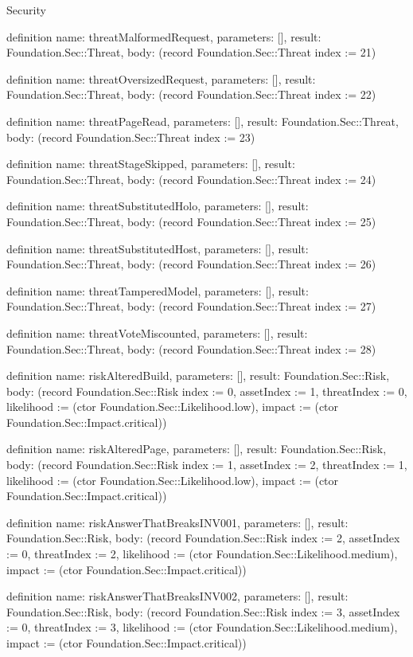 \begin{lexlean}{Security}
\begin{semanticmodule}
definition{
  name: threatMalformedRequest,
  parameters: [],
  result: Foundation.Sec::Threat,
  body: (record Foundation.Sec::Threat {index := 21})
}

definition{
  name: threatOversizedRequest,
  parameters: [],
  result: Foundation.Sec::Threat,
  body: (record Foundation.Sec::Threat {index := 22})
}

definition{
  name: threatPageRead,
  parameters: [],
  result: Foundation.Sec::Threat,
  body: (record Foundation.Sec::Threat {index := 23})
}

definition{
  name: threatStageSkipped,
  parameters: [],
  result: Foundation.Sec::Threat,
  body: (record Foundation.Sec::Threat {index := 24})
}

definition{
  name: threatSubstitutedHolo,
  parameters: [],
  result: Foundation.Sec::Threat,
  body: (record Foundation.Sec::Threat {index := 25})
}

definition{
  name: threatSubstitutedHost,
  parameters: [],
  result: Foundation.Sec::Threat,
  body: (record Foundation.Sec::Threat {index := 26})
}

definition{
  name: threatTamperedModel,
  parameters: [],
  result: Foundation.Sec::Threat,
  body: (record Foundation.Sec::Threat {index := 27})
}

definition{
  name: threatVoteMiscounted,
  parameters: [],
  result: Foundation.Sec::Threat,
  body: (record Foundation.Sec::Threat {index := 28})
}

definition{
  name: riskAlteredBuild,
  parameters: [],
  result: Foundation.Sec::Risk,
  body: (record Foundation.Sec::Risk {index := 0, assetIndex := 1, threatIndex := 0, likelihood := (ctor Foundation.Sec::Likelihood.low), impact := (ctor Foundation.Sec::Impact.critical)})
}

definition{
  name: riskAlteredPage,
  parameters: [],
  result: Foundation.Sec::Risk,
  body: (record Foundation.Sec::Risk {index := 1, assetIndex := 2, threatIndex := 1, likelihood := (ctor Foundation.Sec::Likelihood.low), impact := (ctor Foundation.Sec::Impact.critical)})
}

definition{
  name: riskAnswerThatBreaksINV001,
  parameters: [],
  result: Foundation.Sec::Risk,
  body: (record Foundation.Sec::Risk {index := 2, assetIndex := 0, threatIndex := 2, likelihood := (ctor Foundation.Sec::Likelihood.medium), impact := (ctor Foundation.Sec::Impact.critical)})
}

definition{
  name: riskAnswerThatBreaksINV002,
  parameters: [],
  result: Foundation.Sec::Risk,
  body: (record Foundation.Sec::Risk {index := 3, assetIndex := 0, threatIndex := 3, likelihood := (ctor Foundation.Sec::Likelihood.medium), impact := (ctor Foundation.Sec::Impact.critical)})
}


\end{semanticmodule}
\end{lexlean}
